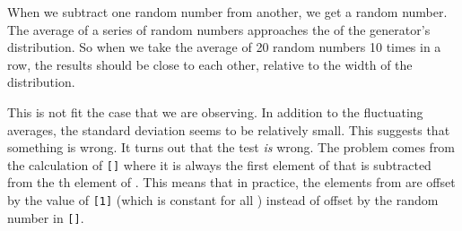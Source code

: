When we subtract one random number from another, we get a random number. The average of a series of random numbers approaches the  of the generator's distribution. So when we take the average of 20 random numbers 10 times in a row, the results should be close to each other, relative to the width of the distribution.

This is not fit the case that we are observing. In addition to the fluctuating averages, the standard deviation seems to be relatively small. This suggests that something is wrong. It turns out that the test \textsl{is} wrong. The problem comes from the calculation of \texttt{[]} where it is always the first element of  that is subtracted from the th element of . This means that in practice, the elements from  are offset by the value of \texttt{[1]} (which is constant for all ) instead of offset by the random number in \texttt{[]}.

